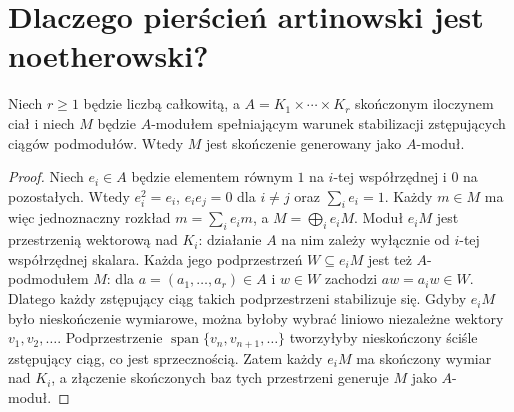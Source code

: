 \section{Dlaczego pierścień artinowski jest noetherowski?}
\begin{lemat}
\label{aa:lem:artin-mod-over-fields}
Niech $r\ge1$ będzie liczbą całkowitą, a
$A=K_1\times\cdots\times K_r$ skończonym iloczynem ciał i niech $M$ będzie $A$-modułem
spełniającym warunek stabilizacji zstępujących
ciągów podmodułów. Wtedy $M$ jest skończenie generowany
jako $A$-moduł.
\end{lemat}
\begin{proof}
Niech $e_i\in A$ będzie elementem równym $1$
na $i$-tej współrzędnej i $0$ na pozostałych.
Wtedy $e_i^2=e_i$, $e_ie_j=0$ dla $i\ne j$
oraz $\sum_i e_i=1$. Każdy $m\in M$ ma więc
jednoznaczny rozkład $m=\sum_i e_im$, a
$M=\bigoplus_i e_iM$.
Moduł $e_iM$ jest przestrzenią wektorową nad $K_i$:
działanie $A$ na nim zależy wyłącznie od $i$-tej
współrzędnej skalara. Każda jego podprzestrzeń $W\subseteq e_iM$ jest też
$A$-podmodułem $M$: dla $a=(a_1,\ldots,a_r)\in A$
i $w\in W$ zachodzi $aw=a_iw\in W$. Dlatego
każdy zstępujący ciąg takich podprzestrzeni stabilizuje się.
Gdyby $e_iM$ było nieskończenie wymiarowe,
można byłoby wybrać liniowo niezależne wektory
$v_1,v_2,\ldots$. Podprzestrzenie
$\operatorname{span}\{v_n,v_{n+1},\ldots\}$
tworzyłyby nieskończony ściśle zstępujący ciąg,
co jest sprzecznością. Zatem każdy $e_iM$ ma
skończony wymiar nad $K_i$, a złączenie skończonych
baz tych przestrzeni generuje $M$ jako $A$-moduł.
\end{proof}

